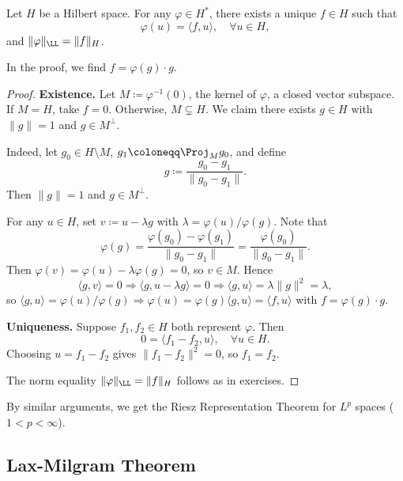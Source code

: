 \begin{theorem}
Let $H$ be a Hilbert space. For any $\varphi \in H^*$, there exists a unique $f \in H$ such that
\[
\varphi(u) = \langle f, u \rangle, \quad \forall u \in H,
\]
and $\|\varphi\|_\LL = \|f\|_H$.
\end{theorem}

\begin{remark}
In the proof, we find $f = \varphi(g) \cdot g$.
\end{remark}

\begin{proof}
\textbf{Existence.} Let $M \coloneqq \varphi^{-1}(0)$, the kernel of $\varphi$, a closed vector subspace. If $M = H$, take $f = 0$. Otherwise, $M \subsetneq H$. We claim there exists $g \in H$ with $\|g\| = 1$ and $g \in M^\perp$.

Indeed, let $g_0 \in H \setminus M$, $g_1 \coloneqq \Proj_M g_0$, and define
\[
g \coloneqq \frac{g_0 - g_1}{\|g_0 - g_1\|}.
\]
Then $\|g\| = 1$ and $g \in M^\perp$.

For any $u \in H$, set $v \coloneqq u - \lambda g$ with $\lambda = \varphi(u)/\varphi(g)$. Note that
\[
\varphi(g) = \frac{\varphi(g_0) - \varphi(g_1)}{\|g_0 - g_1\|} = \frac{\varphi(g_0)}{\|g_0 - g_1\|}.
\]
Then $\varphi(v) = \varphi(u) - \lambda \varphi(g) = 0$, so $v \in M$. Hence
\[
\langle g, v \rangle = 0 \Rightarrow \langle g, u - \lambda g \rangle = 0 \Rightarrow \langle g, u \rangle = \lambda \|g\|^2 = \lambda,
\]
so $\langle g, u \rangle = \varphi(u)/\varphi(g) \Rightarrow \varphi(u) = \varphi(g) \langle g, u \rangle = \langle f, u \rangle$ with $f = \varphi(g) \cdot g$.

\textbf{Uniqueness.} Suppose $f_1, f_2 \in H$ both represent $\varphi$. Then
\[
0 = \langle f_1 - f_2, u \rangle, \quad \forall u \in H.
\]
Choosing $u = f_1 - f_2$ gives $\|f_1 - f_2\|^2 = 0$, so $f_1 = f_2$.

The norm equality $\|\varphi\|_\LL = \|f\|_H$ follows as in exercises.
\end{proof}

\begin{remark}
By similar arguments, we get the Riesz Representation Theorem for $L^p$ spaces ($1 < p < \infty$).
\end{remark}

\subsection{Lax-Milgram Theorem}


